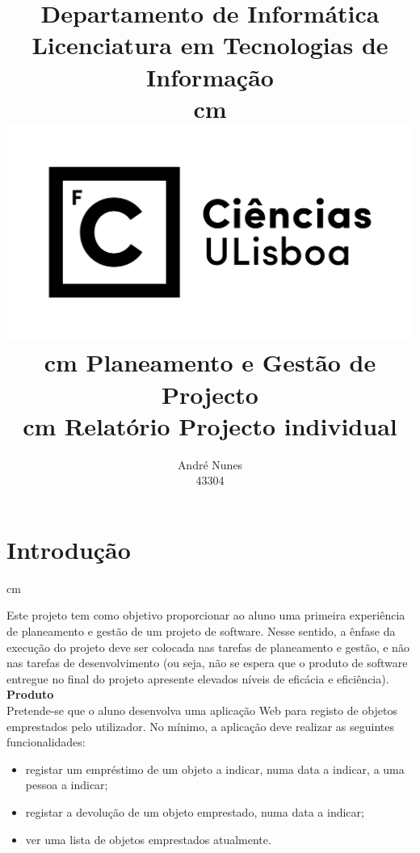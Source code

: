 \documentclass[12pt, a4paper, twoside]{article}
\begin{document}
\title{
Departamento de Informática\\Licenciatura em Tecnologias de Informação\\
 cm
\includegraphics[height=5 cm]{logo_fcul.png}
 cm
Planeamento e Gestão de Projecto\\
 cm
Relatório Projecto individual}
\author{André Nunes\\43304}
\date{}

\maketitle

\newpage
\tableofcontents

\setcounter{page}{1}

\newpage
{}
\setcounter{page}{1}
\section{Introdução}
 cm

Este projeto tem como objetivo proporcionar ao aluno uma primeira experiência de planeamento e gestão de um projeto de software. Nesse sentido, a ênfase da execução do projeto deve ser colocada nas tarefas de planeamento e gestão, e não nas tarefas de desenvolvimento (ou seja, não se espera que o produto de software entregue no final do projeto apresente elevados níveis de eficácia e eficiência).\\

\textbf{Produto}\\

Pretende-se que o aluno desenvolva uma aplicação Web para registo de objetos emprestados pelo utilizador. No mínimo, a aplicação deve realizar as seguintes funcionalidades:
\begin{itemize}
\item registar um empréstimo de um objeto a indicar, numa data a indicar, a uma pessoa a indicar;
\item registar a devolução de um objeto emprestado, numa data a indicar;
\item ver uma lista de objetos emprestados atualmente.
\end{itemize}
\end{document}
